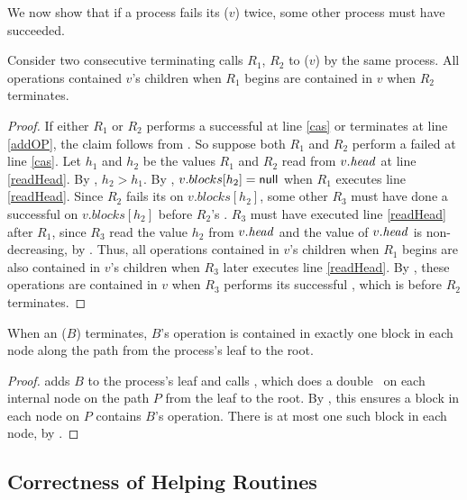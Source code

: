 We now show that if a process fails its ($v$) twice, some other process must have succeeded.

\begin{lemma}\label{lem::doubleRefresh}
Consider two consecutive terminating calls $R_1$, $R_2$ to ($v$) by the same process.
All operations contained $v$'s children when $R_1$ begins
are contained in $v$ when $R_2$ terminates.
\end{lemma}
\begin{proof}
If either $R_1$ or $R_2$ performs a successful  at line \ref{cas} or terminates at line \ref{addOP}, the claim follows
from .
So suppose both $R_1$ and $R_2$ perform a failed  at line \ref{cas}.
Let $h_1$ and $h_2$ be the values $R_1$ and $R_2$ read from $v.\mbox{\textit{head}}$ at line \ref{readHead}.
By , $h_2>h_1$.
By , $v.blocks[h_2]=\mbox{\sf null}$ when $R_1$ executes line \ref{readHead}.
Since $R_2$ fails its  on $v.blocks[h_2]$, some other  $R_3$ must have done
a successful  on $v.blocks[h_2]$ before $R_2$'s .
$R_3$ must have executed line \ref{readHead} after $R_1$, since $R_3$ read the value $h_2$ from $v.\mbox{\textit{head}}$ and the value of $v.\mbox{\textit{head}}$ is non-decreasing, by .
Thus, all operations contained in $v$'s children when $R_1$ begins
are also contained in $v$'s children when $R_3$ later executes line \ref{readHead}.
By , these operations are contained in $v$ when $R_3$ performs its successful ,
which is before $R_2$ terminates.
\end{proof}

\begin{lemma} \label{lem::appendExactlyOnce}
When an ($B$) terminates, $B$'s operation is contained in exactly one block in each node along the path from the process's leaf to the root.
\end{lemma}
\begin{proof}
 adds $B$ to the process's leaf and calls , which
does a double ~on each internal node on the path $P$ from the leaf to the root.
By , this ensures a block in each node on $P$ contains $B$'s operation.
There is at most one such block in each node, by .
\end{proof}


\subsection{Correctness of Helping Routines}
\label{sec::helpingCorrect}

